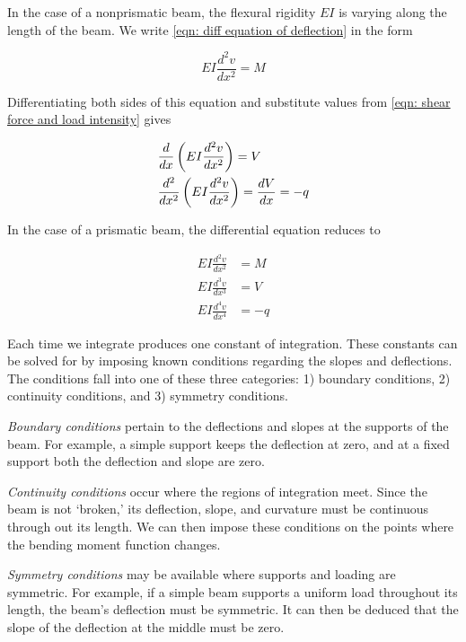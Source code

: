 \documentclass[
10pt,
a4paper,
openany,
svgnames,
]{book}
\begin{document}
In the case of a nonprismatic beam, the flexural rigidity $EI$ is varying along the length of the beam. We write \cref{eqn: diff equation of deflection} in the form

\[EI\frac{d^2v}{dx^2} = M\]

Differentiating both sides of this equation and substitute values from \cref{eqn: shear force and load intensity} gives

\begin{equation}
  \begin{gathered}
    \frac{d}{dx}\left( EI\frac{d^2v}{dx^2} \right) = V \hfill \\
    \frac{d^2}{dx^2}\left( EI\frac{d^2v}{dx^2} \right) = \frac{dV}{dx} =  -q \hfill \\ 
  \end{gathered}
\end{equation}

In the case of a prismatic beam, the differential equation reduces to

\begin{align}
  EI\frac{d^2v}{dx^2} &= M \nonumber \\
  EI\frac{d^3v}{dx^3} &= V \nonumber \\
  EI\frac{d^4v}{dx^4} &=  - q 
\end{align}

Each time we integrate produces one constant of integration. These constants can be solved for by imposing known conditions regarding the slopes and deflections. The conditions fall into one of these three categories: 1) boundary conditions, 2) continuity conditions, and 3) symmetry conditions.

\emph{Boundary conditions} pertain to the deflections and slopes at the supports of the beam. For example, a simple support keeps the deflection at zero, and at a fixed support both the deflection and slope are zero.

\emph{Continuity conditions} occur where the regions of integration meet. Since the beam is not `broken,' its deflection, slope, and curvature must be continuous through out its length. We can then impose these conditions on the points where the bending moment function changes.

\emph{Symmetry conditions} may be available where supports and loading are symmetric. For example, if a simple beam supports a uniform load throughout its length, the beam's deflection must be symmetric. It can then be deduced that the slope of the deflection at the middle must be zero.
\end{document}
